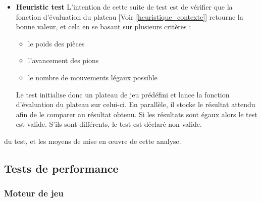 \huge\documentclass{article}
\begin{document}
\begin{itemize}
    \newpage
    \item \textbf{Heuristic test}\newline
    L'intention de cette suite de test est de vérifier que la fonction d'évaluation du plateau [Voir \ref{heuristique_contexte}]
    retourne la bonne valeur, et cela en se basant sur plusieurs critères : 
    \begin{itemize}
        \item le poids des pièces
        \item l'avancement des pions
        \item le nombre de mouvements légaux possible
    \end{itemize}
    Le test initialise donc un plateau de jeu prédéfini et lance la fonction d'évaluation du plateau sur celui-ci.\newline
    En parallèle, il stocke le résultat attendu afin de le comparer au résultat obtenu.\newline
    Si les résultats sont égaux alors le test est valide.
    S'ils sont différents, le test est déclaré non valide.
    
    
    
    
    
    
    
\end{itemize}
du test, et les moyens de mise en œuvre de cette analyse.
\subsection{Tests de performance}
\subsubsection{Moteur de jeu}
\end{document}
